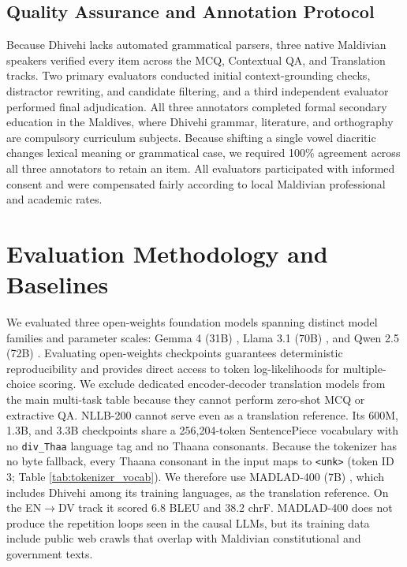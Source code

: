 \documentclass[acmsmall,review,anonymous]{acmart}
\begin{document}
\subsection{Quality Assurance and Annotation Protocol}
Because Dhivehi lacks automated grammatical parsers, three native Maldivian speakers verified every item across the MCQ, Contextual QA, and Translation tracks. Two primary evaluators conducted initial context-grounding checks, distractor rewriting, and candidate filtering, and a third independent evaluator performed final adjudication. All three annotators completed formal secondary education in the Maldives, where Dhivehi grammar, literature, and orthography are compulsory curriculum subjects. Because shifting a single vowel diacritic changes lexical meaning or grammatical case, we required 100\% agreement across all three annotators to retain an item. All evaluators participated with informed consent and were compensated fairly according to local Maldivian professional and academic rates.

\section{Evaluation Methodology and Baselines}
We evaluated three open-weights foundation models spanning distinct model families and parameter scales: Gemma 4 (31B) \cite{team_gemma_2026}, Llama 3.1 (70B) \cite{grattafiori_llama_2024}, and Qwen 2.5 (72B) \cite{qwen_qwen25_2025}. Evaluating open-weights checkpoints guarantees deterministic reproducibility and provides direct access to token log-likelihoods for multiple-choice scoring. We exclude dedicated encoder-decoder translation models from the main multi-task table because they cannot perform zero-shot MCQ or extractive QA. NLLB-200 \cite{team_no_2022} cannot serve even as a translation reference. Its 600M, 1.3B, and 3.3B checkpoints share a 256,204-token SentencePiece vocabulary with no \texttt{div\_Thaa} language tag and no Thaana consonants. Because the tokenizer has no byte fallback, every Thaana consonant in the input maps to \texttt{<unk>} (token ID 3; Table \ref{tab:tokenizer_vocab}). We therefore use MADLAD-400 (7B) \cite{kudugunta_madlad-400_2023}, which includes Dhivehi among its training languages, as the translation reference. On the EN$\rightarrow$DV track it scored 6.8 BLEU and 38.2 chrF. MADLAD-400 does not produce the repetition loops seen in the causal LLMs, but its training data include public web crawls that overlap with Maldivian constitutional and government texts.
\end{document}
